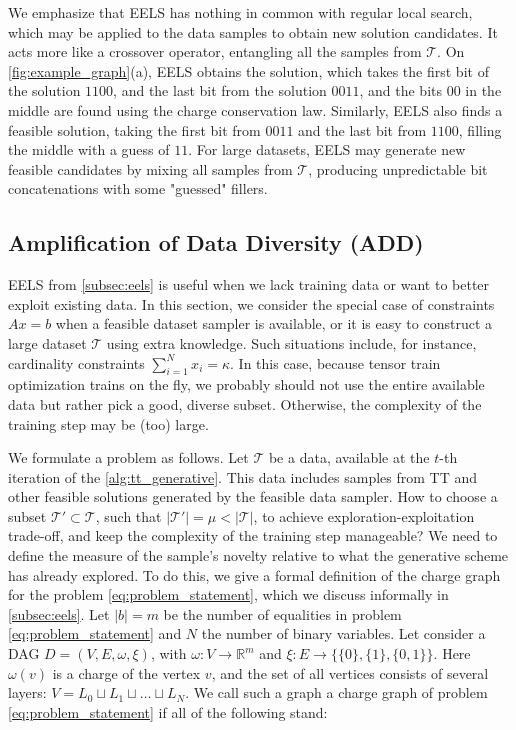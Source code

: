 \documentclass{article}
\theoremstyle{plain}
\theoremstyle{definition}
\theoremstyle{remark}
\begin{document}
We emphasize that EELS has nothing in common with regular local search, which may be applied to the data samples to obtain new solution candidates. It acts more like a crossover operator, entangling all the samples from $\mathcal{T}$. On \cref{fig:example_graph}(a), EELS obtains the solution, which takes the first bit of the solution $1100$, and the last bit from the solution $0011$, and the bits $00$ in the middle are found using the charge conservation law. Similarly, EELS also finds a feasible solution, taking the first bit from $0011$ and the last bit from $1100$, filling the middle with a guess of $11$. For large datasets, EELS may generate new feasible candidates by mixing all samples from $\mathcal{T}$, producing unpredictable bit concatenations with some "guessed" fillers. 

\subsection{Amplification of Data Diversity (ADD)}
\label{subsec:add}

EELS from \cref{subsec:eels} is useful when we lack training data or want to better exploit existing data. In this section, we consider the special case of constraints $Ax=b$ when a feasible dataset sampler is available, or it is easy to construct a large dataset $\mathcal{T}$ using extra knowledge. Such situations include, for instance, cardinality constraints $\sum_{i=1}^N x_i=\kappa$. In this case, because tensor train optimization trains on the fly, we probably should not use the entire available data but rather pick a good, diverse subset. Otherwise, the complexity of the training step may be (too) large.

We formulate a problem as follows. Let $\mathcal{T}$ be a data, available at the $t$-th iteration of the \cref{alg:tt_generative}. This data includes samples from TT and other feasible solutions generated by the feasible data sampler. How to choose a subset $\mathcal{T}'\subset \mathcal{T}$, such that $|\mathcal{T}'| = \mu < |\mathcal{T}|$, to achieve exploration-exploitation trade-off, and keep the complexity of the training step manageable? We need to define the measure of the sample's novelty relative to what the generative scheme has already explored. To do this, we give a formal definition of the charge graph for the problem \eqref{eq:problem_statement}, which we discuss informally in \cref{subsec:eels}.
Let $|b|=m$ be the number of equalities in problem \eqref{eq:problem_statement} and $N$ the number of binary variables. Let consider a DAG $D=(V, E, \omega, \xi)$, with $\omega: V\to \mathbb{R}^m$ and $\xi: E \to \{\{0\}, \{1\}, \{0,1 \}\}$. Here $\omega(v)$ is a charge of the vertex $v$, and the set of all vertices consists of several layers: $V = L_0 \sqcup L_1 \sqcup \dots \sqcup L_N.$
We call such a graph a charge graph of problem \eqref{eq:problem_statement} if all of the following stand:
\end{document}
